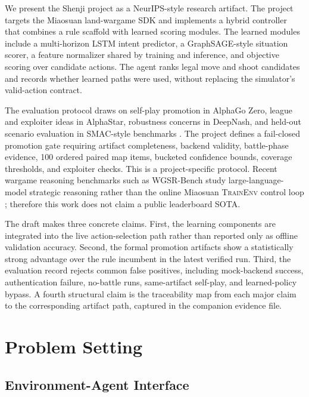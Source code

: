 \documentclass{article}
\newcommand{\env}{\textsc{TrainEnv}}
\begin{document}
We present the Shenji project as a NeurIPS-style research artifact. The project targets the Miaosuan land-wargame SDK and implements a hybrid controller that combines a rule scaffold with learned scoring modules. The learned modules include a multi-horizon LSTM intent predictor, a GraphSAGE-style situation scorer, a feature normalizer shared by training and inference, and objective scoring over candidate actions. The agent ranks legal move and shoot candidates and records whether learned paths were used, without replacing the simulator's valid-action contract.

The evaluation protocol draws on self-play promotion in AlphaGo Zero, league and exploiter ideas in AlphaStar, robustness concerns in DeepNash, and held-out scenario evaluation in SMAC-style benchmarks \citep{silver2017alphagozero,vinyals2019alphastar,perolat2022deepnash,samvelyan2019smac,ellis2023smacv2}. The project defines a fail-closed promotion gate requiring artifact completeness, backend validity, battle-phase evidence, 100 ordered paired map items, bucketed confidence bounds, coverage thresholds, and exploiter checks. This is a project-specific protocol. Recent wargame reasoning benchmarks such as WGSR-Bench study large-language-model strategic reasoning rather than the online Miaosuan \env{} control loop \citep{yin2025wgsrbench}; therefore this work does not claim a public leaderboard SOTA.

The draft makes three concrete claims. First, the learning components are integrated into the live action-selection path rather than reported only as offline validation accuracy. Second, the formal promotion artifacts show a statistically strong advantage over the rule incumbent in the latest verified run. Third, the evaluation record rejects common false positives, including mock-backend success, authentication failure, no-battle runs, same-artifact self-play, and learned-policy bypass. A fourth structural claim is the traceability map from each major claim to the corresponding artifact path, captured in the companion evidence file.

\section{Problem Setting}

\subsection{Environment-Agent Interface}
\end{document}
